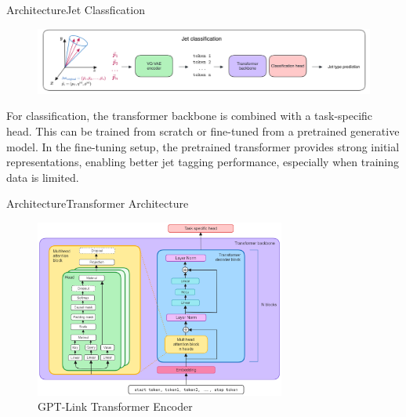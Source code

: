 \documentclass[10pt]{beamer}
\begin{document}
\begin{frame}{Architecture}{Jet Classfication}

\begin{figure}
  \includegraphics[width=\textwidth]{jet_classification.png}
\end{figure}

For classification, the transformer backbone is combined with a task-specific head. This can be trained from scratch or fine-tuned from a pretrained generative model. In the fine-tuning setup, the pretrained transformer provides strong initial representations, enabling better jet tagging performance, especially when training data is limited.

\end{frame}


\begin{frame}{Architecture}{Transformer Architecture}

\begin{figure}
  \includegraphics[height=2.3in]{transformer.png}
  \caption{GPT-Link Transformer Encoder}
\end{figure}

\end{frame}
\end{document}
